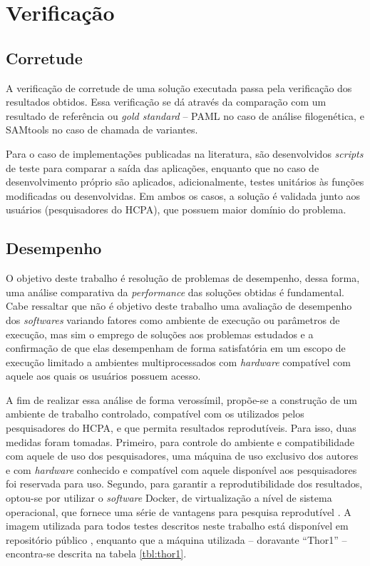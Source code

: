 \documentclass[cic,tc]{iiufrgs}
\begin{document}
\section{Verificação}
\label{sec:test}

\subsection{Corretude}

A verificação de corretude de uma solução executada passa pela verificação dos
resultados obtidos. Essa verificação se dá através da comparação com um
resultado de referência ou \textit{gold standard} -- PAML no caso de análise
filogenética, e SAMtools no caso de chamada de variantes.

Para o caso de implementações publicadas na literatura, são desenvolvidos
\textit{scripts} de teste para comparar a saída das aplicações, enquanto que no
caso de desenvolvimento próprio são aplicados, adicionalmente, testes unitários
às funções modificadas ou desenvolvidas. Em ambos os casos, a solução é
validada junto aos usuários (pesquisadores do HCPA), que possuem maior domínio
do problema.

\subsection{Desempenho}

O objetivo deste trabalho é resolução de problemas de desempenho, dessa forma,
uma análise comparativa da \textit{performance} das soluções obtidas é
fundamental. Cabe ressaltar que não é objetivo deste trabalho uma avaliação de
desempenho dos \textit{softwares} variando fatores como ambiente de execução ou
parâmetros de execução, mas sim o emprego de soluções aos problemas estudados e
a confirmação de que elas desempenham de forma satisfatória em um escopo de
execução limitado a ambientes multiprocessados com \textit{hardware} compatível com
aquele aos quais os usuários possuem acesso.

A fim de realizar essa análise de forma verossímil, propõe-se a construção de
um ambiente de trabalho controlado, compatível com os utilizados pelos
pesquisadores do HCPA, e que permita resultados reprodutíveis. Para isso, duas
medidas foram tomadas. Primeiro, para controle do ambiente e compatibilidade
com aquele de uso dos pesquisadores, uma máquina de uso exclusivo dos autores e
com \textit{hardware} conhecido e compatível com aquele disponível aos
pesquisadores foi reservada para uso. Segundo, para garantir a
reprodutibilidade dos resultados, optou-se por utilizar o \textit{software}
Docker, de virtualização a nível de sistema operacional, que fornece uma série
de vantagens para pesquisa reprodutível \cite{boettiger2015introduction}. A
imagem utilizada para todos testes descritos neste trabalho está disponível em
repositório público \cite{dockerme}, enquanto que a máquina utilizada --
doravante ``Thor1'' -- encontra-se descrita na tabela \ref{tbl:thor1}.
\end{document}
